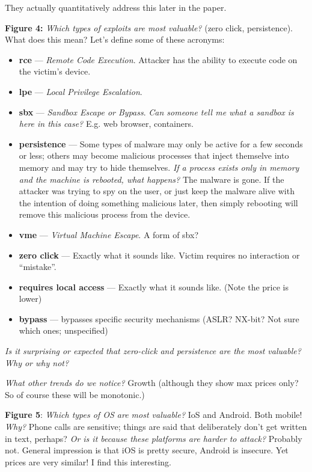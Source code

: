 \documentclass[11pt]{article}
\begin{document}
They actually quantitatively address this later in the paper. 

{\bf Figure 4:} {\it Which types of exploits are most valuable?} (zero click, persistence). What does this mean? Let's define some of these acronyms:
\begin{itemize}
    \item {\bf rce} --- {\it Remote Code Execution}. Attacker has the ability to execute code on the victim's device. 
    \item {\bf lpe} --- {\it Local Privilege Escalation}. 
    \item {\bf sbx} --- {\it Sandbox Escape or Bypass}. {\it Can someone tell me what a sandbox is here in this case? } E.g. web browser, containers.
    \item {\bf persistence} --- Some types of malware may only be active for a few seconds or less; others may become malicious processes that inject themselve into memory and may try to hide themselves. {\it If a process exists only in memory and the machine is rebooted, what happens?} The malware is gone. If the attacker was trying to spy on the user, or just keep the malware alive with the intention of doing something malicious later, then simply rebooting will remove this malicious process from the device. 
    \item {\bf vme} --- {\it Virtual Machine Escape}. A form of sbx?
    \item {\bf zero click} --- Exactly what it sounds like. Victim requires no interaction or ``mistake''.
    \item {\bf requires local access} --- Exactly what it sounds like. (Note the price is lower)
    \item {\bf bypass} --- bypasses specific security mechanisms (ASLR? NX-bit? Not sure which ones; unspecified)
\end{itemize}

{\it Is it surprising or expected that zero-click and persistence are the most valuable? Why or why not?} 

{\it What other trends do we notice?} Growth (although they show max prices only? So of course these will be monotonic.)

{\bf Figure 5}: {\it Which types of OS are most valuable?} IoS and Android. Both mobile! {\it Why?} Phone calls are sensitive; things are said that deliberately don't get written in text, perhaps? {\it Or is it because these platforms are harder to attack?} Probably not. General impression is that iOS is pretty secure, Android is insecure. Yet prices are very similar! I find this interesting.
\end{document}
